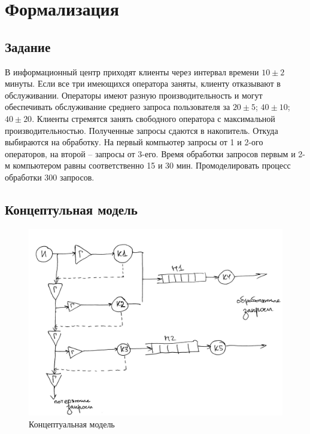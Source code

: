 \documentclass[a4paper,oneside,12pt]{extreport}
\begin{document}


\tableofcontents

\chapter{Формализация}

\section{Задание}

В информационный центр приходят клиенты через интервал времени $10 \pm 2$ минуты.
Если все три имеющихся оператора заняты, клиенту отказывают в обслуживании.
Операторы имеют разную производительность и могут обеспечивать обслуживание среднего запроса пользователя за $20 \pm 5$; $40 \pm 10$; $40 \pm 20$.
Клиенты стремятся занять свободного оператора с максимальной производительностью. Полученные запросы сдаются в накопитель.
Откуда выбираются на обработку.
На первый компьютер запросы от 1 и 2-ого операторов, на второй – запросы от 3-его. Время обработки запросов первым и 2-м компьютером равны соответственно 15 и 30 мин. Промоделировать процесс обработки 300 запросов.

\section{Концептульная модель}

\begin{figure}[H]
	\centering
	\includegraphics[width=0.9\linewidth]{inc/img/conceptual-model-qt.jpg}
	\caption{Концептуальная модель}
	\label{conceptual-model-qt}
\end{figure}
\end{document}
